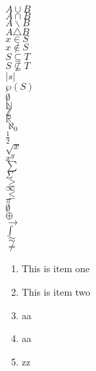 \documentclass[12pt, letterpaper]{report}
\begin{document}
$	A \cup B		$\\
$	A \cap B		$\\
$	A \backslash B	$\\
$	A \triangle B	$\\
$	x \in S			$\\
$	x \not\in S		$\\
$	S \subseteq T	$\\
$	S \not\subseteq T$\\
$	|s|				$\\
$	\wp(S)			$\\
$	\emptyset		$\\
$	\mathbb{N}		$\\
$	\mathbb{Z}		$\\
$	\mathbb{R}		$\\
$	\aleph_0		$\\
$	\frac{1}{2}		$\\
$	\sqrt{x}		$\\
$	x^y				$\\
$	\sum			$\\
$	\Sigma			$\\
$	\geq			$\\
$	\infty			$\\
$	\leq			$\\
$	\pi				$\\
$	\emptyset		$\\
$	\oplus			$\\
$	\rightarrow		$\\
$	\int			$\\
$	\approx			$\\
$	\neq			$\\






\begin{enumerate}
	\item This is item one
	\item This is item two
	\item aa
	\item aa
	\item zz
\end{enumerate}
\end{document}
